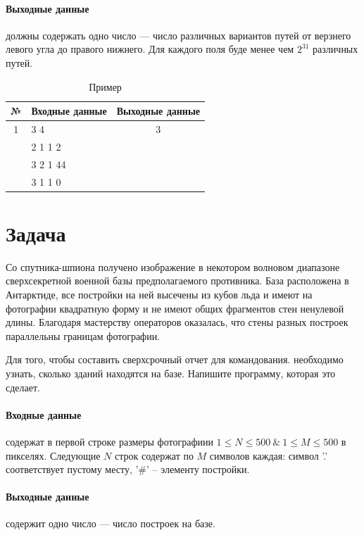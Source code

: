 \documentclass[12pt, twoside]{article}
\begin{document}
\paragraph{Выходные данные} должны содержать одно число --- число различных вариантов путей от верзнего левого угла  до правого нижнего. Для каждого поля буде менее чем $2^{31}$ различных путей.

\begin{table}[h]
\begin{center}
\caption{Пример}
\begin{tabular}{|c|c|c|}
\hline
	 № &Входные данные& Выходные данные\\
	\hline
	
	1
	&
	\multicolumn{1}{|l|}{3 4}
	&
	3\\
	~
	&
	\multicolumn{1}{|l|}{2 1 1 2}
	&
	~\\
	~
	&
	\multicolumn{1}{|l|}{3 2 1 44}
	&
	~\\
	~
	&
	\multicolumn{1}{|l|}{3 1 1 0}
	&
	~\\
	\hline

\end{tabular}
\end{center}
\end{table}

\section{Задача~\cite{second}}
Со спутника-шпиона получено изображение в некотором волновом диапазоне сверхсекретной военной базы предполагаемого противника. База расположена в Антарктиде, все постройки на ней высечены из кубов льда и имеют на фотографии квадратную форму и не имеют общих фрагментов стен ненулевой длины. Благодаря мастерству операторов оказалась, что стены разных построек параллельны границам фотографии.

Для того, чтобы составить сверхсрочный отчет для командования. необходимо узнать, сколько зданий находятся на базе. Напишите программу, которая это сделает.
\paragraph{Входные данные} содержат в первой строке размеры фотографиии $1\leq N\leq 500~\&~1\leq M\leq 500$ в пикселях. Следующие $N$ строк содержат по $M$ символов каждая: символ '.' соответствует пустому месту, '\#' -- элементу постройки.
\paragraph{Выходные данные} содержит одно число --- число построек на базе.
\end{document}
